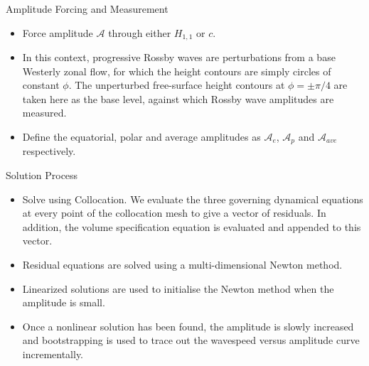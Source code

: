 \documentclass[pdf,distiller]{prosper}
\begin{document}
\begin{slide}{Amplitude Forcing and Measurement}
\begin{itemize}
\item Force amplitude $\mathcal{A}$ through either $H_{1,1}$ or $c$.
\item In this context, progressive Rossby waves are perturbations from a base Westerly zonal flow, for which the height contours are simply circles of constant $\phi$. The unperturbed free-surface height contours at $\phi=\pm\pi/4$ are taken here as the base level, against which Rossby wave amplitudes are measured.
\item Define the equatorial, polar and average amplitudes as $\mathcal{A}_{e}$, $\mathcal{A}_{p}$ and $\mathcal{A}_{ave}$ respectively.
\end{itemize}
\end{slide}

\begin{slide}{Solution Process}
\begin{itemize}
\item Solve using Collocation. We evaluate the three governing dynamical equations at every point of the collocation mesh to give a vector of residuals. In addition, the volume specification equation is evaluated and appended to this vector.
\item Residual equations are solved using a multi-dimensional Newton method.
\item Linearized solutions are used to initialise the Newton method when the amplitude is small.
\item Once a nonlinear solution has been found, the amplitude is slowly increased and bootstrapping is used to trace out the wavespeed versus amplitude curve incrementally.
\end{itemize}
\end{slide}
\end{document}
